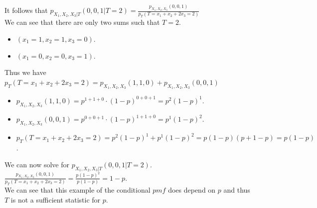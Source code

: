 \documentclass[12pt]{article}
\newcommand{\XB}{\color{black}}
\newcommand{\XV}{\color{violet}}
\begin{document}
\noindent
It follows that $ \displaystyle p_{X_{1}, X_{2}, X_{3} | T}(0, 0, 1 | T = 2) = \frac{p_{X_{1}, X_{2}, X_{3}}(0, 0, 1)}{p_{T}(T = x_{1} + x_{2} + 2x_{3} = 2)} $ \\

\noindent
We can see that there are only two sums such that $ T = 2 $.
\begin{itemize}
    \item $ (x_{1} = 1, x_{2} = 1, x_{3} = 0) $.
    \item $ (x_{1} = 0, x_{2} = 0, x_{3} = 1) $.
\end{itemize}

\noindent
Thus we have $ p_{T}(T = x_{1} + x_{2} + 2x_{3} = 2) = p_{X_{1}, X_{2}, X_{3}}(1, 1, 0) + p_{X_{1}, X_{2}, X_{3}}(0, 0, 1) $
\begin{itemize}
    \item $ p_{X_{1}, X_{2}, X_{3}}(1, 1, 0) = p^{1 + 1 + 0} \cdot (1 - p)^{0 + 0 + 1} = p^{2}(1 - p)^{1} $.
    \item $ p_{X_{1}, X_{2}, X_{3}}(0, 0, 1) = p^{0 + 0 + 1} \cdot (1 - p)^{1 + 1 + 0} = p^{1}(1 - p)^{2} $.
    \item $ p_{T}(T = x_{1} + x_{2} + 2x_{3} = 2) = p^{2}(1 - p)^{1} + p^{1}(1 - p)^{2} = p(1 - p)(p + 1 - p) = p(1 - p) $.
\end{itemize}

\noindent
We can now solve for $ p_{X_{1}, X_{2}, X_{3} | T}(0, 0, 1 | T = 2) $. \\

$ \displaystyle \frac{p_{X_{1}, X_{2}, X_{3}}(0, 0, 1)}{p_{T}(T = x_{1} + x_{2} + 2x_{3} = 2)} = \frac{p(1 - p)^{2}}{p(1 - p)} = 1 - p $. \\

\noindent
We can see that this example of the conditional $ pmf $ does depend on $ p $ and thus $ T $ is not a sufficient statistic for $ p $.

\end{document}
